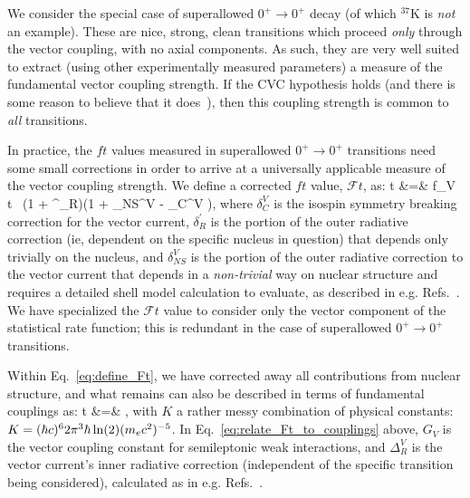 We consider the special case of superallowed $0^+ \rightarrow 0^+$ decay (of which $^{37}$K is \emph{not} an example).  These are nice, strong, clean transitions which proceed \emph{only} through the vector coupling, with no axial components.  As such, they are very well suited to extract (using other experimentally measured parameters) a measure of the fundamental vector coupling strength.  If the \ac{CVC} hypothesis holds (and there is some reason to believe that it does~\cite{severijns2006}\cite{HardyTownerSuperallowed2020}), then this coupling strength is common to \emph{all} transitions.

In practice, the $ft$ values measured in superallowed $0^+ \rightarrow 0^+$ transitions need some small corrections in order to arrive at a universally applicable measure of the vector coupling strength.  We define a corrected $ft$ value, $\mathcal{F}t$, as:
\bea
{}t &=& f_V t \, (1 + \delta^\prime_R)(1 + \delta_{NS}^V - \delta_C^{V} ),
\label{eq:define_Ft}
\eea
where 
$\delta_C^{V}$ is the isospin symmetry breaking correction for the vector current, 
$\delta^\prime_R$ is the portion of the outer radiative correction (ie, dependent on the specific nucleus in question) that depends only trivially on the nucleus, 
and
$\delta_{NS}^{V}$ is the portion of the outer radiative correction %
to the vector current that depends in a \emph{non-trivial} way on nuclear structure and requires a detailed shell model calculation to evaluate, as described in e.g.  Refs.~\cite{TownerHardy2008}\cite{JausRasche1990}\cite{barker1992}\cite{Towner1992}\cite{Towner1994}.  We have specialized the $\mathcal{F}t$ value to consider only the vector component of the statistical rate function; this is redundant in the case of superallowed $0^+ \rightarrow 0^+$ transitions.

Within Eq.~\ref{eq:define_Ft}, we have corrected away all contributions from nuclear structure, and what remains can also be described in terms of fundamental couplings as:
\bea
{}t &=& ,
\label{eq:relate_Ft_to_couplings}
\eea
with $K$ a rather messy combination of physical constants: $K = (\hbar c)^6 2\pi^3 \hbar \ln(2) (m_e c^2)^{-5}$.  In Eq.~\ref{eq:relate_Ft_to_couplings} above, $G_V$ is the vector coupling constant for semileptonic weak interactions, and $\Delta_R^{V}$ is the vector current's inner radiative correction (independent of the specific transition being considered), calculated as in e.g. Refs.~\cite{MarcianoSirlin_1986}\cite{MarcianoSirlin_2006}\cite{CzarneckiMarcianoSirlin_2019}.  %

